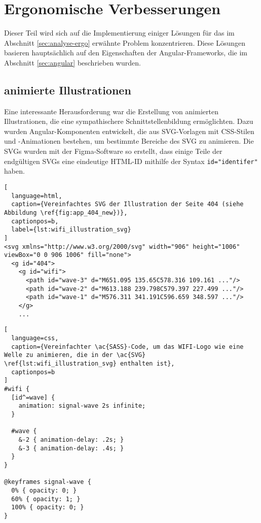 \section{Ergonomische Verbesserungen}

Dieser Teil wird sich auf die Implementierung einiger Lösungen für das im Abschnitt \ref{sec:analyse-ergo} erwähnte Problem konzentrieren.
Diese Lösungen basieren hauptsächlich auf den Eigenschaften der Angular-Frameworks, die im Abschnitt \ref{sec:angular} beschrieben wurden.

\subsection{animierte Illustrationen}

Eine interessante Herausforderung war die Erstellung von animierten Illustrationen, die eine sympathischere Schnittstellenbildung ermöglichten.
Dazu wurden Angular-Komponenten entwickelt, die aus \ac{SVG}-Vorlagen mit \ac{CSS}-Stilen und -Animationen bestehen, um bestimmte Bereiche des \ac{SVG} zu animieren.
Die SVGs wurden mit der Figma-Software so erstellt, dass einige Teile der endgültigen SVGs eine eindeutige \ac{HTML}-ID mithilfe der Syntax \lstinline{id="identifer"} haben.

\begin{lstlisting}[
  language=html,
  caption={Vereinfachtes SVG der Illustration der Seite 404 (siehe Abbildung \ref{fig:app_404_new})},
  captionpos=b,
  label={lst:wifi_illustration_svg}
]
<svg xmlns="http://www.w3.org/2000/svg" width="906" height="1006" viewBox="0 0 906 1006" fill="none">
  <g id="404">
    <g id="wifi">
      <path id="wave-3" d="M651.095 135.65C578.316 109.161 ..."/>
      <path id="wave-2" d="M613.188 239.798C579.397 227.499 ..."/>
      <path id="wave-1" d="M576.311 341.191C596.659 348.597 ..."/>
    </g>
    ...
\end{lstlisting}

\begin{lstlisting}[
  language=css,
  caption={Vereinfachter \ac{SASS}-Code, um das WIFI-Logo wie eine Welle zu animieren, die in der \ac{SVG} \ref{lst:wifi_illustration_svg} enthalten ist},
  captionpos=b
]
#wifi {
  [id^=wave] {
    animation: signal-wave 2s infinite;
  }

  #wave {
    &-2 { animation-delay: .2s; }
    &-3 { animation-delay: .4s; }
  }
}

@keyframes signal-wave {
  0% { opacity: 0; }
  60% { opacity: 1; }
  100% { opacity: 0; }
}
\end{lstlisting}

